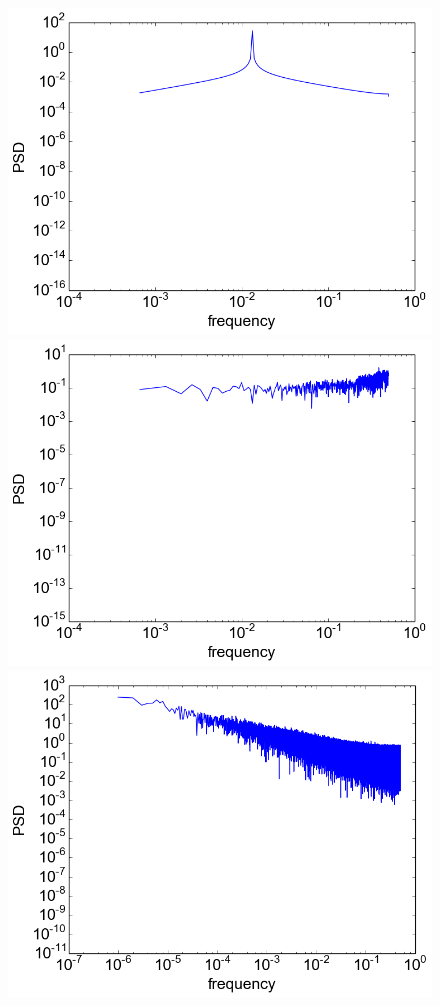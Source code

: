 \documentclass[12pt]{article}
\begin{document}
\begin{figure}
  \centering
  \includegraphics[scale=0.4]{spectrum_sinusoid}
  \includegraphics[scale=0.4]{spectrum_logistic}
  \includegraphics[scale=0.4]{spectrum_fbm}

\end{figure}
\end{document}
